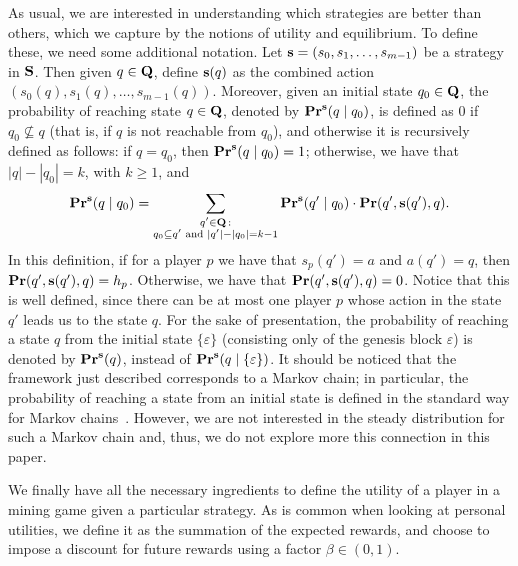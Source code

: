 As usual, we are interested in understanding which strategies are better than others, which we capture by the notions of  utility and equilibrium. To define these, we need some additional notation.
Let $\mathbf{s} = (s_0, s_1, \ldots, s_{m-1})$ be a strategy in $\mathbf{S}$. Then given $q \in \mathbf{Q}$, define $\mathbf{s}(q)$ as the combined action $(s_0(q), s_1(q), \ldots, s_{m-1}(q))$. Moreover, given an initial state $q_0 \in \mathbf{Q}$,
the probability of reaching state $q \in \mathbf{Q}$, denoted by $\mathbf{Pr}^{\mathbf{s}}(q \mid q_0)$, is defined as 0 if $q_0 \not\subseteq q$ (that is, if $q$ is not reachable from $q_0$), and otherwise it is recursively defined as follows: if $q =  q_0$, then $\mathbf{Pr}^{\mathbf{s}}(q \mid q_0) = 1$; otherwise, we have that $|q| - |q_0| = k$, with $k \geq 1$, and
$$
\mathbf{Pr}^{\mathbf{s}}(q \mid q_0) =
\sum_{\substack{q' \in \mathbf{Q} \,:\\ q_0 \subseteq q' \text{ and } |q'| - |q_0| = k-1}}
 \mathbf{Pr}^{\mathbf{s}}(q' \mid q_0) \cdot \mathbf{Pr}(q', \mathbf{s}(q'), q).
 $$
In this definition, if for a player $p$ we have that $s_p(q') = a$ and $a(q') = q$, then $\mathbf{Pr}(q', \mathbf{s}(q'), q) = h_p$. Otherwise, we have that $\mathbf{Pr}(q', \mathbf{s}(q'), q) = 0$. Notice that this is well defined, since there can be at most one player $p$ whose action in the state $q'$ leads us to the state $q$.
For the sake of presentation, the probability of reaching a state $q$ from the initial state $\{\varepsilon\}$ (consisting only of the genesis block $\varepsilon$) is denoted by $\mathbf{Pr}^{\mathbf{s}}(q)$, instead of $\mathbf{Pr}^{\mathbf{s}}(q \mid \{\varepsilon\})$. 
It should be noticed that the framework just described corresponds to a Markov chain; in particular, the probability of reaching a state from an initial state is defined in the standard way for Markov chains~\cite{MU05}. However, we are not interested in the steady distribution for such a Markov chain and, thus, we do not explore more this connection in this paper.

We finally have all the necessary ingredients to define the utility of a player in a mining game given a particular strategy. As is common
when looking at personal utilities, we define it as the summation of the expected rewards, and choose
to impose a discount for future rewards using a factor $\beta \in (0,1)$.

